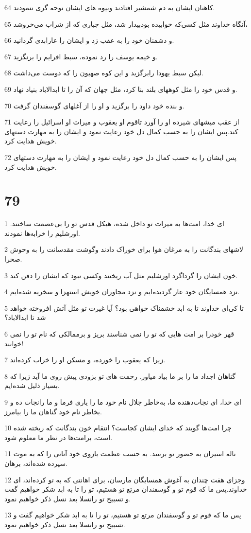 \par 64 کاهنان ایشان به دم شمشیر افتادند وبیوه های ایشان نوحه گری ننمودند.
\par 65 آنگاه خداوند مثل کسی‌که خوابیده بودبیدار شد، مثل جباری که از شراب می‌خروشد،
\par 66 و دشمنان خود را به عقب زد و ایشان را عارابدی گردانید.
\par 67 و خیمه یوسف را رد نموده، سبط افرایم را برنگزید.
\par 68 لیکن سبط یهودا رابرگزید و این کوه صهیون را که دوست می‌داشت.
\par 69 و قدس خود را مثل کوههای بلند بنا کرد، مثل جهان که آن را تا ابدالاباد بنیاد نهاد.
\par 70 و بنده خود داود را برگزید و او را از آغلهای گوسفندان گرفت.
\par 71 از عقب میشهای شیرده او را آورد تاقوم او یعقوب و میراث او اسرائیل را رعایت کند.پس ایشان را به حسب کمال دل خود رعایت نمود و ایشان را به مهارت دستهای خویش هدایت کرد.
\par 72 پس ایشان را به حسب کمال دل خود رعایت نمود و ایشان را به مهارت دستهای خویش هدایت کرد.
 
\chapter{79}

\par 1 ای خدا، امت‌ها به میراث تو داخل شده، هیکل قدس تو را بی‌عصمت ساختند. اورشلیم را خرابه‌ها نمودند.
\par 2 لاشهای بندگانت را به مرغان هوا برای خوراک دادند وگوشت مقدسانت را به وحوش صحرا.
\par 3 خون ایشان را گرداگرد اورشلیم مثل آب ریختند وکسی نبود که ایشان را دفن کند.
\par 4 نزد همسایگان خود عار گردیده‌ایم و نزد مجاوران خویش استهزا و سخریه شده‌ایم.
\par 5 تا کی‌ای خداوند تا به ابد خشمناک خواهی بود؟ آیا غیرت تو مثل آتش افروخته خواهد شد تا ابدالاباد؟
\par 6 قهر خودرا بر امت هایی که تو را نمی شناسند بریز و برممالکی که نام تو را نمی خوانند!
\par 7 زیرا که یعقوب را خورده، و مسکن او را خراب کرده‌اند.
\par 8 گناهان اجداد ما را بر ما بیاد میاور. رحمت های تو بزودی پیش روی ما آید زیرا که بسیار ذلیل شده‌ایم.
\par 9 ‌ای خدا، ای نجات‌دهنده ما، به‌خاطر جلال نام خود ما را یاری فرما و ما رانجات ده و بخاطر نام خود گناهان ما را بیامرز.
\par 10 چرا امت‌ها گویند که خدای ایشان کجاست؟ انتقام خون بندگانت که ریخته شده است، برامت‌ها در نظر ما معلوم شود.
\par 11 ناله اسیران به حضور تو برسد. به حسب عظمت بازوی خود آنانی را که به موت سپرده شده‌اند، برهان.
\par 12 وجزای هفت چندان به آغوش همسایگان مارسان، برای اهانتی که به تو کرده‌اند، ای خداوند.پس ما که قوم تو و گوسفندان مرتع تو هستیم، تو را تا به ابد شکر خواهیم گفت و تسبیح تو رانسلا بعد نسل ذکر خواهیم نمود.
\par 13 پس ما که قوم تو و گوسفندان مرتع تو هستیم، تو را تا به ابد شکر خواهیم گفت و تسبیح تو رانسلا بعد نسل ذکر خواهیم نمود.
 

